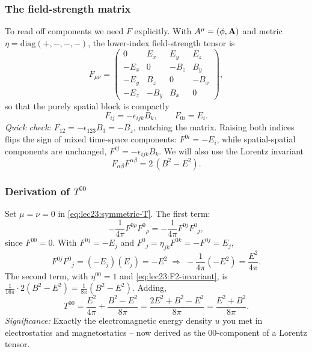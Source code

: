 \subsubsection*{The field-strength matrix}
To read off components we need $F$ explicitly. With $A^\mu=(\phi,\mathbf{A})$ and metric
$\eta=\mathrm{diag}(+,-,-,-)$, the lower-index field-strength tensor is
\begin{equation}\label{eq:lec23:F-matrix}
  F_{\mu\nu}=
  \begin{pmatrix}
    0 & E_x & E_y & E_z\\
    -E_x & 0 & -B_z & B_y\\
    -E_y & B_z & 0 & -B_x\\
    -E_z & -B_y & B_x & 0
  \end{pmatrix},
\end{equation}
so that the purely spatial block is compactly
\begin{equation}\label{eq:lec23:Fij}
  F_{ij}=-\epsilon_{ijk}B_k,\qquad F_{0i}=E_i .
\end{equation}
\textit{Quick check:} $F_{12}=-\epsilon_{123}B_3=-B_z$, matching the matrix. Raising both
indices flips the sign of mixed time-space components: $F^{0i}=-E_i$, while spatial-spatial
components are unchanged, $F^{ij}=-\epsilon_{ijk}B_k$. We will also use the Lorentz
invariant
\begin{equation}\label{eq:lec23:F2-invariant}
  F_{\alpha\beta}F^{\alpha\beta}=2\,(B^2-E^2).
\end{equation}


\subsubsection*{Derivation of $T^{00}$}
Set $\mu=\nu=0$ in \eqref{eq:lec23:symmetric-T}. The first term:
\begin{equation}\label{eq:lec23:T00-step1}
  -\frac{1}{4\pi}F^{0\rho}F^{0}{}_{\rho}
  =-\frac{1}{4\pi}F^{0j}F^{0}{}_{j},
\end{equation}
since $F^{00}=0$. With $F^{0j}=-E_j$ and $F^{0}{}_{j}=\eta_{jk}F^{0k}=-F^{0j}=E_j$,
\begin{equation}\label{eq:lec23:T00-step2}
  F^{0j}F^{0}{}_{j}=(-E_j)(E_j)=-E^2
  \;\Rightarrow\;
  -\frac{1}{4\pi}(-E^2)=\frac{E^2}{4\pi}.
\end{equation}
The second term, with $\eta^{00}=1$ and \eqref{eq:lec23:F2-invariant}, is
$\tfrac{1}{16\pi}\cdot 2(B^2-E^2)=\tfrac{1}{8\pi}(B^2-E^2)$. Adding,
\begin{equation}\label{eq:lec23:T00-final}
  T^{00}=\frac{E^2}{4\pi}+\frac{B^2-E^2}{8\pi}
        =\frac{2E^2+B^2-E^2}{8\pi}
        =\boxed{\frac{E^2+B^2}{8\pi}.}
\end{equation}
\textit{Significance:} Exactly the electromagnetic energy density $u$ you met in
electrostatics and magnetostatics -- now derived as the $00$-component of a Lorentz tensor.

